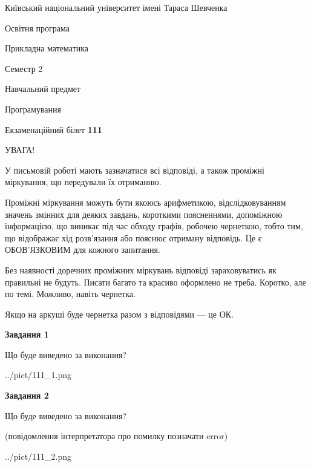 \documentclass[12pt, ukrainian]{article}
\begin{document}
{{\begin {small}\par
{ \center  Київський національний університет імені Тараса Шевченка \par}
{\parbox {5 cm}{Освітня програма \hfill}{\parbox {7 cm}{Прикладна математика\hfill}}\parbox {6 cm}{\hfill Семестр 2}}\par
{\parbox {5 cm} {Навчальний предмет \hfill}\parbox {7 cm}{Програмування \hfill}\parbox {6cm}{\hfill}\par}\vspace{-7pt} \end{small}}{\center Екзаменаційний білет \No \textbf
{ 111 }\par}}
{
\begin {large}
УВАГА!

У письмовій роботі мають зазначатися всі відповіді, а також проміжні міркування, що передували їх отриманню.

Проміжні міркування можуть бути якоюсь арифметикою, відслідковуванням зна\-чень змінних для деяких завдань,
короткими поясненнями, допоміжною інформацією, що виникає під час обходу графів, робочею чернеткою,
тобто тим, що відображає хід розв’язання або пояснює отриману відповідь.
Це є ОБОВ’ЯЗКОВИМ для кожного запитання.

Без наявності доречних проміжних міркувань відповіді зараховуватись як правиль\-ні не будуть.
Писати багато та красиво оформлено не треба. Коротко, але по темі. Можли\-во, навіть чернетка.

Якщо на аркуші буде чернетка разом з відповідями --- це ОК.

\newpage

{\begin {center}\textbf{Завдання 1}\end {center}}\par
Що буде виведено за виконання?\par
\begin{center}
	{../pict/111_1.png}
\end{center}
\newpage

{\begin {center}\textbf{Завдання 2}\end {center}}\par
Що буде виведено за виконання?\par
 (повідомлення інтерпретатора про помилку позначати error)\par
\begin{center}
	{../pict/111_2.png}
\end{center}
\newpage


\end{large}}
\end{document}
